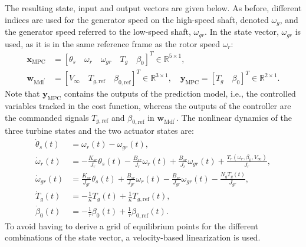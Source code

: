 %
The resulting state, input and output vectors are given below. As before, different indices are used for the generator speed on the high-speed shaft, denoted $\omega_g$, and the generator speed referred to the low-speed shaft, $\omega_{gr}$. In the state vector, $\omega_{gr}$ is used, as it is in the same reference frame as the rotor speed $\omega_r$:
\begin{equation}\label{eq:xMPCyMPC}
    \begin{aligned}
        \bm{x}_{\text{MPC}} &= [\theta_{s} \quad \omega_r \quad \omega_{gr} \quad T_g \quad \beta_0]^T \in \mathbb{R}^{5 \times 1},\\
        \bm{w}_{\text{Mdl}^\prime} &= [V_{\infty} \quad T_{g,\text{ref}} \quad \beta_{0,\text{ref}}]^T \in \mathbb{R}^{3 \times 1}, \quad
        \bm{y}_{\text{MPC}} = [T_g \quad \beta_0]^T \in \mathbb{R}^{2 \times 1}.
    \end{aligned}
\end{equation}
%
Note that $\bm{y}_{\text{MPC}}$ contains the outputs of the prediction model, i.e., the controlled variables tracked in the cost function, whereas the outputs of the controller are the commanded signals $T_{g,\text{ref}}$ and $\beta_{0,\text{ref}}$ in $\bm{w}_{\text{Mdl}^\prime}$. The nonlinear dynamics of the three turbine states and the two actuator states are:
\begin{align}
    \dot{\theta}_s(t) &= \omega_r(t)-\omega_{gr}(t) \label{eq:NLDyn1},\\
    \dot{\omega}_r(t) &= -\frac{K_{sr}}{J_r}\theta_s(t)-\frac{B_{sr}}{J_r}\omega_r(t)+\frac{B_{sr}}{J_r}\omega_{gr}(t)+\frac{T_r(\omega_r, \beta_0, V_\infty)}{J_r},\\
    \dot{\omega}_{gr}(t) &= \frac{K_{sr}}{J_{gr}}\theta_s(t)+\frac{B_{sr}}{J_{gr}}\omega_r(t)-\frac{B_{sr}}{J_{gr}}\omega_{gr}(t)-\frac{N_g T_g(t)}{J_{gr}} \label{eq:NLDyn3},\\
    \dot{T}_{g}(t) &= -\frac{1}{\kappa}T_{g}(t)+\frac{1}{\kappa}T_{g,\text{ref}}(t),\\
    \dot{\beta}_0(t) &= -\frac{1}{\tau}\beta_0(t)+\frac{1}{\tau}\beta_{0,\text{ref}}(t).\label{eq:NLDyn5}
\end{align}
%
To avoid having to derive a grid of equilibrium points for the different combinations of the state vector, a velocity-based linearization is used.

